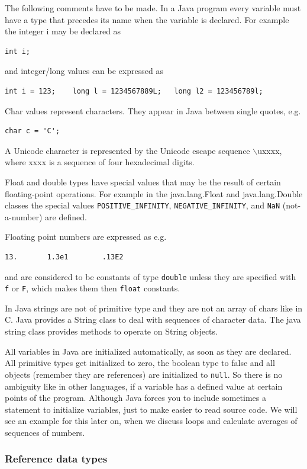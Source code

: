 The following comments have to be made. In a Java program every
variable must have a type that precedes its name when the variable is
declared. For example the integer i may be declared as
\begin{verbatim}
int i;
\end{verbatim}
and integer/long values can be expressed as
\begin{verbatim}
int i = 123;    long l = 1234567889L;   long l2 = 123456789l;
\end{verbatim}

Char values represent characters. They appear in Java between single
quotes, e.g.
\begin{verbatim}
char c = 'C';
\end{verbatim}
A Unicode character is represented by the Unicode escape sequence
$\backslash$uxxxx, where xxxx is a sequence of four hexadecimal digits.


Float and double types have special values that may be the result of
certain floating-point operations. For example in the java.lang.Float
and java.lang.Double classes the special values
\verb|POSITIVE_INFINITY|, \verb|NEGATIVE_INFINITY|, and 
\verb|NaN| (not-a-number) are
defined.

Floating point numbers are expressed as e.g.
\begin{verbatim}
13.       1.3e1        .13E2 
\end{verbatim}
and are considered to be constants of type \verb|double| 
unless they are specified with \verb|f| or \verb|F|, which makes them
then \verb|float| constants.

In Java strings are not of primitive type and they are not an
array of chars like in C. Java provides a String
class to deal with sequences of character data. The java string
class provides methods to operate on String objects.

All variables in Java are initialized automatically, as soon as they
are declared. All primitive types get initialized to zero, the boolean type
to false and all objects (remember they are references) are initialized
to \verb|null|. So there is no ambiguity like in other languages, if
a variable has a defined value at certain points of the program. 
Although Java forces you to include sometimes a statement to
initialize variables, just to make easier to read source code.
We will see an example for this later on, when we discuss loops
and calculate averages of sequences of numbers.

\subsubsection{Reference data types}
\label{sec:Reference_data_types}


